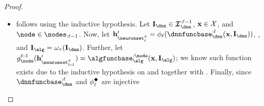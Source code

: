 \begin{proof}
\begin{itemize}[topsep=0pt]
\begin{subequations}
\begin{align}
                &= \abstractionmap_{\nodesoutput}\bigg(\dnnfunclayer{\layer:}\Big(\dnnfunclayer{:\layer}(\bx, \interventionsdnn)\Big)\bigg) 
                & \mathcomment{definition of }\hiddenstates'_{\neuronset_{\layer}} \\
                &= \abstractionmap_{\nodesoutput}\bigg(\dnnfunclayer{\layer:}\Big(\dnnfunclayer{\layer\!-\!1}\big(\dnnfunclayer{:\layer\!-\!1}(\bx, \interventionsdnn)\big)\Big)\bigg) 
                & \mathcomment{no intervention at layer }\layer \\
                &= \abstractionmap_{\nodesoutput}\bigg(\dnnfunclayer{\layer\!-\!1:}\Big(\dnnfunclayer{:\layer\!-\!1}(\bx, \interventionsdnn)\Big)\bigg)
                & \mathcomment{definition of }\dnnfunclayer{\layer\!-\!1:} \\
                &= \abstractionmap_{\nodesoutput}\bigg(\dnnfunclayer{\layer\!-\!1:}\Big(\hiddenstates'_{\neuronset_{\layer\!-\!1}}\Big)\bigg)
                & \mathcomment{definition of }\hiddenstates'_{\neuronset_{\layer\!-\!1}} \\
                &= \algfunc(\bx, \interventionsalg)
                & \mathcomment{inductive hypothesis on }\inductioncircle{2}
            \end{align}\label{eq:condition_two_for_No_intervention}
        \end{subequations}
        This shows $\inductioncircle{2}$ holds for layer $\layer$ when there is no intervention in layer $\layer$.
        \item {} follows using the inductive hypothesis. 
        Let $\interventionsdnn \in \interventionsset^{:\layer-1}_{\dnn}$, $\mathbf{x} \in \mathcal{X}$, and $\node \in \nodes_{:\layer-1}$.
        Now, let $\hiddenstates'_{\neuronset^{\causalmap}_{\layer}} = \causalmap_{\layer}(\dnnfunclayer{:\layer}(\bx, \interventionsdnn))$, 
        ,
        and $\interventionsalg = \interventionmap(\interventionsdnn)$.
        Further, let $g_{\node}^{\layer\!-\!1}(\hiddenstates'_{\neuronset^{\causalmap}_{\layer\!-\!1}}) = \algfuncnode{:\node}(\bx, \interventionsalg)$; 
        we know such function exists due to the inductive hypothesis on  and  together with .
        Finally, since $\dnnfunclayer{:\layer}$ and $\causalmap^{\noninter}_{\layer}$ are injective

\end{itemize}
\end{proof}
